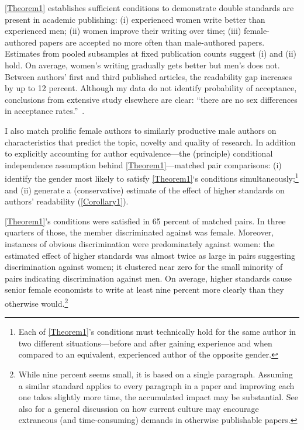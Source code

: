 \autoref{Theorem1} establishes sufficient conditions to demonstrate double standards are present in academic publishing: (i) experienced women write better than experienced men; (ii) women improve their writing over time; (iii) female-authored papers are accepted no more often than male-authored papers. Estimates from pooled subsamples at fixed publication counts suggest (i) and (ii) hold. On average, women's writing gradually gets better but men's does not. Between authors' first and third published articles, the readability gap increases by up to 12 percent. Although my data do not identify probability of acceptance, conclusions from extensive study elsewhere are clear: ``there are no sex differences in acceptance rates.''~\citep[][p. 111; see also \autoref{seumatching} for references to other research supporting this claim]{Ceci2014}.

I also match prolific female authors to similarly productive male authors on characteristics that predict the topic, novelty and quality of research. In addition to explicitly accounting for author equivalence---the (principle) conditional independence assumption behind \autoref{Theorem1}---matched pair comparisons: (i) identify the gender most likely to satisfy \autoref{Theorem1}`s conditions simultaneously;\footnote{Each of \autoref{Theorem1}'s conditions must technically hold for the same author in two different situations---before and after gaining experience and when compared to an equivalent, experienced author of the opposite gender.} and (ii) generate a (conservative) estimate of the effect of higher standards on authors' readability (\autoref{Corollary1}).

\autoref{Theorem1}'s conditions were satisfied in 65 percent of matched pairs. In three quarters of those, the member discriminated against was female. Moreover, instances of obvious discrimination were predominately against women: the estimated effect of higher standards was almost twice as large in pairs suggesting discrimination against women; it clustered near zero for the small minority of pairs indicating discrimination against men. On average, higher standards cause senior female economists to write at least nine percent more clearly than they otherwise would.\footnote{While nine percent seems small, it is based on a single paragraph. Assuming a similar standard applies to every paragraph in a paper and improving each one takes slightly more time, the accumulated impact may be substantial. See also \citet{Berk2017} for a general discussion on how current culture may encourage extraneous (and time-consuming) demands in otherwise publishable papers.}

